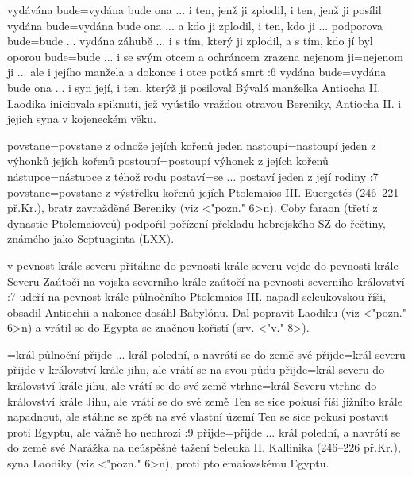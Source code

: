     {vydávána bude}={vydána bude ona ... i ten, jenž ji zplodil, i ten, jenž ji posílil}   %
    {vydána bude}={vydána bude ona ... a kdo ji zplodil, i ten, kdo ji ... podporova}   %
    {bude}={bude ... vydána záhubě ... i s tím, který ji zplodil, a s tím, kdo jí byl oporou}   %
    {bude}={bude ... i se svým otcem a ochráncem zrazena}   %
    {nejenom ji}={nejenom ji ... ale i jejího manžela a dokonce i otce potká smrt}   %
:6 {vydána bude}={vydána bude ona ... i syn její, i ten, kterýž ji posiloval} 
    Bývalá manželka Antiocha II. Laodika iniciovala spiknutí, jež vyústilo vraždou otravou Bereniky, Antiocha II. i jejich syna v kojeneckém věku.


    {povstane}={povstane z odnože jejích kořenů jeden}   %
    {nastoupí}={nastoupí jeden z výhonků jejích kořenů}   %
    {postoupí}={postoupí výhonek z jejích kořenů}   %
    {nástupce}={nástupce z téhož rodu}   %
    {postaví}={se ... postaví jeden z její rodiny}   %
:7 {povstane}={povstane z výstřelku kořenů jejích}  Ptolemaios  III. Euergetés (246--221         př.Kr.), bratr zavražděné Bereniky (viz <"pozn." 6>n). Coby faraon (třetí z dynastie     Ptolemaiovců) podpořil pořízení překladu hebrejského SZ do řečtiny, známého jako Septuaginta (LXX). 


    {v pevnost krále severu}   %
    {přitáhne do pevnosti krále severu}   %
    {vejde do pevnosti krále Severu}   %
    {Zaútočí na vojska severního krále}   %
    {zaútočí na pevnosti severního království}   %
:7 {udeří na pevnost krále půlnočního}  
    Ptolemaios III. napadl seleukovskou říši, obsadil Antiochii a nakonec dosáhl Babylónu. Dal popravit Laodiku (viz <"pozn." 6>n) a vrátil se do Egypta se značnou kořistí (srv. <"v." 8>).


={král půlnoční přijde ... král polední, a navrátí se do země své}   %
    {přijde}={král severu přijde v království krále jihu, ale vrátí se na svou půdu}   %
    {přijde}={král severu do království krále jihu, ale vrátí se do své země}   %
    {vtrhne}={král Severu vtrhne do království krále Jihu, ale vrátí se do své země}   %
    {Ten se sice pokusí říši jižního krále napadnout, ale stáhne se zpět na své vlastní území}  %
    {Ten se sice pokusí postavit proti Egyptu, ale vážně ho neohrozí}  %
:9 {přijde}={přijde ... král polední, a navrátí se do země své}  
    Narážka na neúspěšné tažení Seleuka II. Kallinika (246--226 př.Kr.), syna Laodiky (viz <"pozn." 6>n), proti ptolemaiovskému Egyptu.

